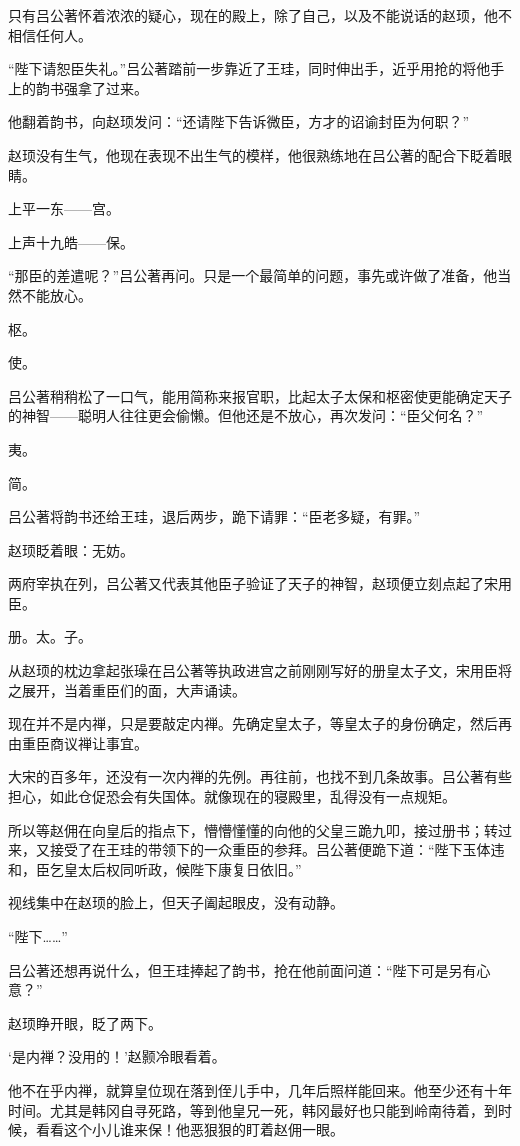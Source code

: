 只有吕公著怀着浓浓的疑心，现在的殿上，除了自己，以及不能说话的赵顼，他不相信任何人。 

“陛下请恕臣失礼。”吕公著踏前一步靠近了王珪，同时伸出手，近乎用抢的将他手上的韵书强拿了过来。 

他翻着韵书，向赵顼发问：“还请陛下告诉微臣，方才的诏谕封臣为何职？” 

赵顼没有生气，他现在表现不出生气的模样，他很熟练地在吕公著的配合下眨着眼睛。 

上平一东——宫。 

上声十九皓——保。 

“那臣的差遣呢？”吕公著再问。只是一个最简单的问题，事先或许做了准备，他当然不能放心。 

枢。 

使。 

吕公著稍稍松了一口气，能用简称来报官职，比起太子太保和枢密使更能确定天子的神智——聪明人往往更会偷懒。但他还是不放心，再次发问：“臣父何名？” 

夷。 

简。 

吕公著将韵书还给王珪，退后两步，跪下请罪：“臣老多疑，有罪。” 

赵顼眨着眼：无妨。 

两府宰执在列，吕公著又代表其他臣子验证了天子的神智，赵顼便立刻点起了宋用臣。 

册。太。子。 

从赵顼的枕边拿起张璪在吕公著等执政进宫之前刚刚写好的册皇太子文，宋用臣将之展开，当着重臣们的面，大声诵读。 

现在并不是内禅，只是要敲定内禅。先确定皇太子，等皇太子的身份确定，然后再由重臣商议禅让事宜。 

大宋的百多年，还没有一次内禅的先例。再往前，也找不到几条故事。吕公著有些担心，如此仓促恐会有失国体。就像现在的寝殿里，乱得没有一点规矩。 

所以等赵佣在向皇后的指点下，懵懵懂懂的向他的父皇三跪九叩，接过册书；转过来，又接受了在王珪的带领下的一众重臣的参拜。吕公著便跪下道：“陛下玉体违和，臣乞皇太后权同听政，候陛下康复日依旧。” 

视线集中在赵顼的脸上，但天子阖起眼皮，没有动静。 

“陛下……” 

吕公著还想再说什么，但王珪捧起了韵书，抢在他前面问道：“陛下可是另有心意？” 

赵顼睁开眼，眨了两下。 

‘是内禅？没用的！’赵颢冷眼看着。 

他不在乎内禅，就算皇位现在落到侄儿手中，几年后照样能回来。他至少还有十年时间。尤其是韩冈自寻死路，等到他皇兄一死，韩冈最好也只能到岭南待着，到时候，看看这个小儿谁来保！他恶狠狠的盯着赵佣一眼。 

